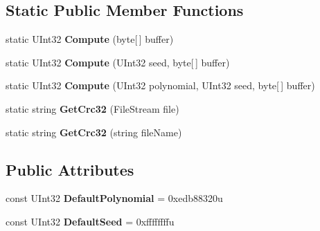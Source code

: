 \subsection*{Static Public Member Functions}
\begin{DoxyCompactItemize}
\item 
\hypertarget{class_snowflake_1_1_utility_1_1_crc32_a7a213babf0c0906d5d2f7b2325f1b93d}{}static U\+Int32 {\bfseries Compute} (byte\mbox{[}$\,$\mbox{]} buffer)\label{class_snowflake_1_1_utility_1_1_crc32_a7a213babf0c0906d5d2f7b2325f1b93d}

\item 
\hypertarget{class_snowflake_1_1_utility_1_1_crc32_a7064144245a3b084fd02b4bbb86e947d}{}static U\+Int32 {\bfseries Compute} (U\+Int32 seed, byte\mbox{[}$\,$\mbox{]} buffer)\label{class_snowflake_1_1_utility_1_1_crc32_a7064144245a3b084fd02b4bbb86e947d}

\item 
\hypertarget{class_snowflake_1_1_utility_1_1_crc32_a0f86bf9e182c258db61b4ae51bf1479c}{}static U\+Int32 {\bfseries Compute} (U\+Int32 polynomial, U\+Int32 seed, byte\mbox{[}$\,$\mbox{]} buffer)\label{class_snowflake_1_1_utility_1_1_crc32_a0f86bf9e182c258db61b4ae51bf1479c}

\item 
\hypertarget{class_snowflake_1_1_utility_1_1_crc32_ad56dbb47725d2d8e85fb42c0fc535b67}{}static string {\bfseries Get\+Crc32} (File\+Stream file)\label{class_snowflake_1_1_utility_1_1_crc32_ad56dbb47725d2d8e85fb42c0fc535b67}

\item 
\hypertarget{class_snowflake_1_1_utility_1_1_crc32_ae38f0258308028c6ac121f9c3fdf9544}{}static string {\bfseries Get\+Crc32} (string file\+Name)\label{class_snowflake_1_1_utility_1_1_crc32_ae38f0258308028c6ac121f9c3fdf9544}

\end{DoxyCompactItemize}
\subsection*{Public Attributes}
\begin{DoxyCompactItemize}
\item 
\hypertarget{class_snowflake_1_1_utility_1_1_crc32_a0c1ef2a44440c814edb8d5db345b4fb8}{}const U\+Int32 {\bfseries Default\+Polynomial} = 0xedb88320u\label{class_snowflake_1_1_utility_1_1_crc32_a0c1ef2a44440c814edb8d5db345b4fb8}

\item 
\hypertarget{class_snowflake_1_1_utility_1_1_crc32_aaa9368fd3ae31f87beb2e975ed66e6c7}{}const U\+Int32 {\bfseries Default\+Seed} = 0xffffffffu\label{class_snowflake_1_1_utility_1_1_crc32_aaa9368fd3ae31f87beb2e975ed66e6c7}

\end{DoxyCompactItemize}
